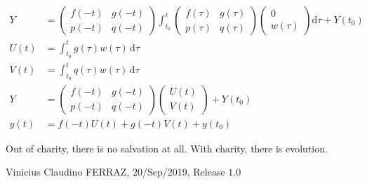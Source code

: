 \documentclass[12pt]{article}
\begin{document}
\begin{align}
 Y &= \begin{pmatrix} f(-t) & g(-t) \\ p(-t) & q(-t) \end{pmatrix} \int_{t_0}^t \begin{pmatrix} f(\tau) & g(\tau) \\ p(\tau) & q(\tau) \end{pmatrix} \begin{pmatrix} 0 \\ w(\tau) \end{pmatrix} \mathrm{d}\tau + Y(t_0) \\
 U(t) &= \int_{t_0}^t g(\tau) w(\tau) \,\mathrm{d}\tau \\
 V(t) &= \int_{t_0}^t q(\tau) w(\tau) \,\mathrm{d}\tau \\
 Y &= \begin{pmatrix} f(-t) & g(-t) \\ p(-t) & q(-t) \end{pmatrix}  \begin{pmatrix} U(t) \\ V(t) \end{pmatrix} + Y(t_0) \\
 y(t) &= f(-t)U(t) + g(-t)V(t)  + y(t_0)
\end{align}


\vspace{3mm}

Out of charity, there is no salvation at all. With charity, there is evolution.

\vspace{3mm}

Vinicius Claudino FERRAZ, 20/Sep/2019, Release $1.0$
\end{document}
